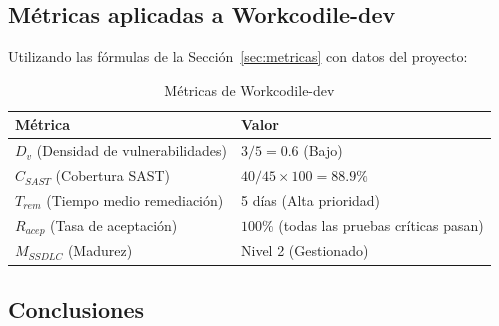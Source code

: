 \subsection{Métricas aplicadas a Workcodile-dev}

Utilizando las fórmulas de la Sección~\ref{sec:metricas} con datos del proyecto:

\begin{table}[h]
\centering
\small
\begin{tabular}{|l|l|}
\hline
\textbf{Métrica} & \textbf{Valor} \\
\hline
$D_v$ (Densidad de vulnerabilidades) & $3 / 5 = 0.6$ (Bajo) \\
$C_{SAST}$ (Cobertura SAST) & $40 / 45 \times 100 = 88.9\%$ \\
$T_{rem}$ (Tiempo medio remediación) & 5 días (Alta prioridad) \\
$R_{acep}$ (Tasa de aceptación) & $100\%$ (todas las pruebas críticas pasan) \\
$M_{SSDLC}$ (Madurez) & Nivel 2 (Gestionado) \\
\hline
\end{tabular}
\caption{Métricas de Workcodile-dev}
\label{tab:metricas-workcodile}
\end{table}

\subsection{Conclusiones}

